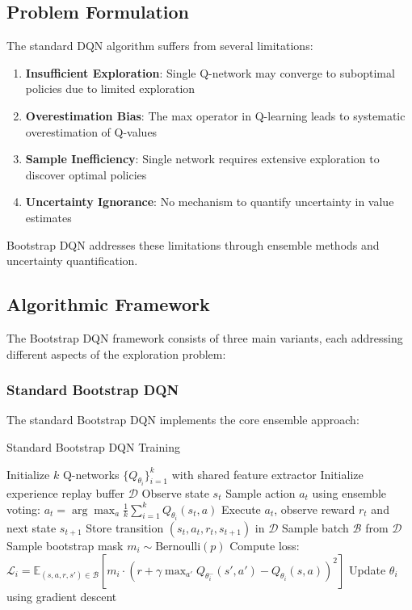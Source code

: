 \documentclass[12pt]{article}
\begin{document}
{{{\subsection{Problem Formulation}

The standard DQN algorithm suffers from several limitations:
\begin{enumerate}
    \item \textbf{Insufficient Exploration}: Single Q-network may converge to suboptimal policies due to limited exploration
    \item \textbf{Overestimation Bias}: The max operator in Q-learning leads to systematic overestimation of Q-values
    \item \textbf{Sample Inefficiency}: Single network requires extensive exploration to discover optimal policies
    \item \textbf{Uncertainty Ignorance}: No mechanism to quantify uncertainty in value estimates
\end{enumerate}

Bootstrap DQN addresses these limitations through ensemble methods and uncertainty quantification.

\subsection{Algorithmic Framework}

The Bootstrap DQN framework consists of three main variants, each addressing different aspects of the exploration problem:

\subsubsection{Standard Bootstrap DQN}
The standard Bootstrap DQN implements the core ensemble approach:

\begin{algorithm}[H]
\caption{Standard Bootstrap DQN Training}
\begin{algorithmic}[1]
\STATE Initialize $k$ Q-networks $\{Q_{\theta_i}\}_{i=1}^k$ with shared feature extractor
\STATE Initialize experience replay buffer $\mathcal{D}$
        \STATE Observe state $s_t$
        \STATE Sample action $a_t$ using ensemble voting: $a_t = \arg\max_a \frac{1}{k}\sum_{i=1}^k Q_{\theta_i}(s_t, a)$
        \STATE Execute $a_t$, observe reward $r_t$ and next state $s_{t+1}$
        \STATE Store transition $(s_t, a_t, r_t, s_{t+1})$ in $\mathcal{D}$
            \STATE Sample batch $\mathcal{B}$ from $\mathcal{D}$
                \STATE Sample bootstrap mask $m_i \sim \text{Bernoulli}(p)$
                \STATE Compute loss: $\mathcal{L}_i = \mathbb{E}_{(s,a,r,s') \in \mathcal{B}}[m_i \cdot (r + \gamma \max_{a'} Q_{\theta_i^-}(s', a') - Q_{\theta_i}(s, a))^2]$
                \STATE Update $\theta_i$ using gradient descent
            \ENDFOR
        \ENDIF
    \ENDFOR
\ENDFOR
\end{algorithmic}
\end{algorithm}

}}}
\end{document}

